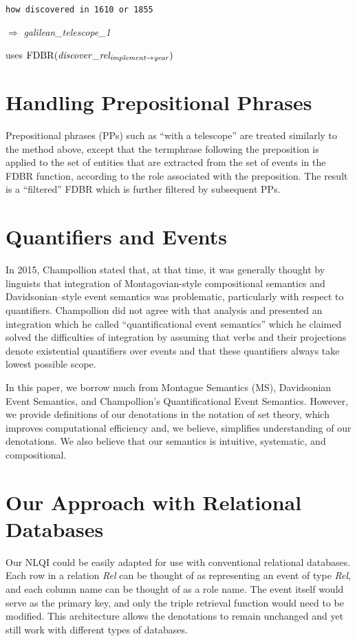 \documentclass[../main.tex]{subfiles}
\begin{document}
\begin{refsection}
\noindent \texttt{how discovered in 1610 or 1855}

$\Rightarrow$  \textit{galilean\_telescope\_1}

uses $\mathrm{FDBR}({\mathit{discover\_rel_{implement \rightarrow year}}})$

\section{Handling Prepositional Phrases}

Prepositional phrases (PPs) such as ``with a telescope'' are treated
similarly to the method above, except that the termphrase
following the preposition is applied to the set of entities that are extracted from
the set of events in the FDBR function, according to the role associated with
the preposition. The result is a ``filtered'' FDBR which is further filtered by
subsequent PPs.

\section{Quantifiers and Events}
\label{webist2019conf:quant}
In 2015, Champollion \cite{champollion2015interaction} stated that, at that time, it was generally thought by linguists that integration of Montagovian-style compositional semantics and Davidsonian–style event semantics \cite{parsons1990events,davidson1967logical} was problematic, particularly with respect to quantifiers. Champollion did not agree with that analysis and presented an integration which he called ``quantificational event semantics'' which he claimed solved the difficulties of integration by assuming that verbs and their projections denote existential quantifiers over events and that these quantifiers always take lowest possible scope.

In this paper, we borrow much from Montague Semantics (MS), Davidsonian Event Semantics,
and Champollion's Quantificational Event Semantics. However, we provide definitions of our
denotations in the notation of set theory, which improves computational efficiency and, we
believe, simplifies understanding of our denotations. We also believe that our semantics is
intuitive, systematic, and compositional.

\section{Our Approach with Relational Databases}

Our NLQI could be easily adapted for use with conventional relational databases. 
Each row in a relation \textit{Rel} can be thought of as representing an event of type \textit{Rel}, and each column name can be thought of as a role name.  The event itself would serve as the primary key, and only the triple retrieval function would need to be modified.  This architecture allows the denotations to remain unchanged and yet still work with different types of databases.


\end{refsection}
\end{document}
